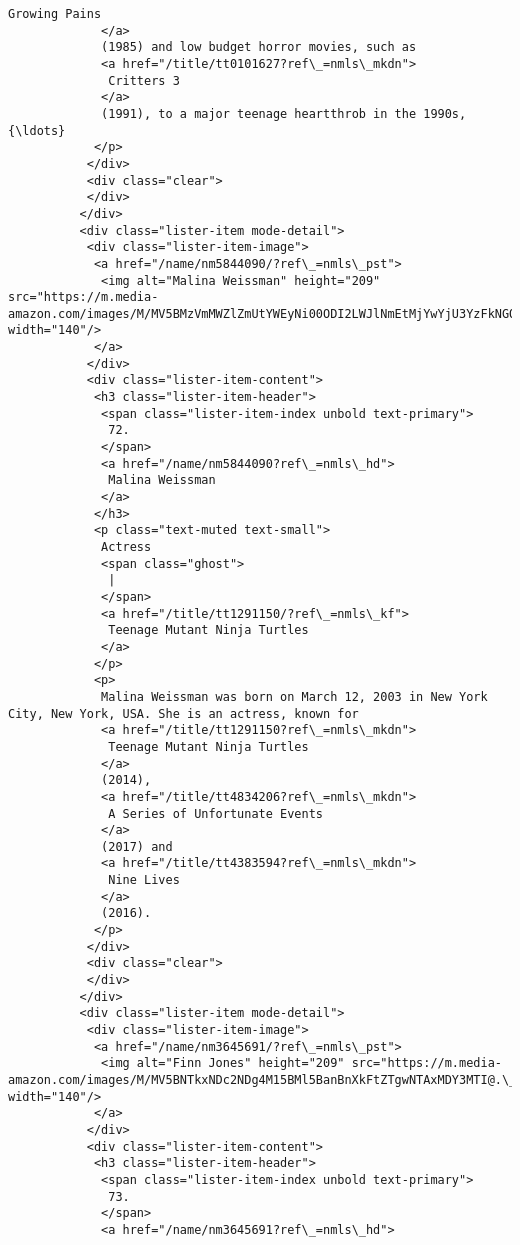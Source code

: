 \documentclass[11pt]{article}
\begin{document}
\begin{Verbatim}[commandchars=\\\{\}]
              Growing Pains
             </a>
             (1985) and low budget horror movies, such as
             <a href="/title/tt0101627?ref\_=nmls\_mkdn">
              Critters 3
             </a>
             (1991), to a major teenage heartthrob in the 1990s,{\ldots}
            </p>
           </div>
           <div class="clear">
           </div>
          </div>
          <div class="lister-item mode-detail">
           <div class="lister-item-image">
            <a href="/name/nm5844090/?ref\_=nmls\_pst">
             <img alt="Malina Weissman" height="209" src="https://m.media-amazon.com/images/M/MV5BMzVmMWZlZmUtYWEyNi00ODI2LWJlNmEtMjYwYjU3YzFkNGQyXkEyXkFqcGdeQXVyNDQ2ODQ1Njc@.\_V1\_UY209\_CR8,0,140,209\_AL\_.jpg" width="140"/>
            </a>
           </div>
           <div class="lister-item-content">
            <h3 class="lister-item-header">
             <span class="lister-item-index unbold text-primary">
              72.
             </span>
             <a href="/name/nm5844090?ref\_=nmls\_hd">
              Malina Weissman
             </a>
            </h3>
            <p class="text-muted text-small">
             Actress
             <span class="ghost">
              |
             </span>
             <a href="/title/tt1291150/?ref\_=nmls\_kf">
              Teenage Mutant Ninja Turtles
             </a>
            </p>
            <p>
             Malina Weissman was born on March 12, 2003 in New York City, New York, USA. She is an actress, known for
             <a href="/title/tt1291150?ref\_=nmls\_mkdn">
              Teenage Mutant Ninja Turtles
             </a>
             (2014),
             <a href="/title/tt4834206?ref\_=nmls\_mkdn">
              A Series of Unfortunate Events
             </a>
             (2017) and
             <a href="/title/tt4383594?ref\_=nmls\_mkdn">
              Nine Lives
             </a>
             (2016).
            </p>
           </div>
           <div class="clear">
           </div>
          </div>
          <div class="lister-item mode-detail">
           <div class="lister-item-image">
            <a href="/name/nm3645691/?ref\_=nmls\_pst">
             <img alt="Finn Jones" height="209" src="https://m.media-amazon.com/images/M/MV5BNTkxNDc2NDg4M15BMl5BanBnXkFtZTgwNTAxMDY3MTI@.\_V1\_UX140\_CR0,0,140,209\_AL\_.jpg" width="140"/>
            </a>
           </div>
           <div class="lister-item-content">
            <h3 class="lister-item-header">
             <span class="lister-item-index unbold text-primary">
              73.
             </span>
             <a href="/name/nm3645691?ref\_=nmls\_hd">

\end{Verbatim}
\end{document}

